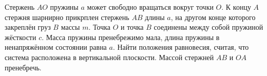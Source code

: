 Стержень $AO$ пружины $a$ может свободно вращаться вокруг точки $O$.
К концу $A$ стержня шарнирно прикрплен стержень $AB$ длины $a$,
на другом конце которого закреплён груз $B$ массы $m$.
Точка $O$ и точка $B$ соединены между собой пружиной жёсткости $c$.
Масса пружины пренебрежимо мала,
длина пружины в ненапряжённом состоянии равна $a$.
Найти положения равновесия, считая,
что система расположена в вертикальной плоскости.
Массой стержней $AB$ и $OA$ пренебречь.
